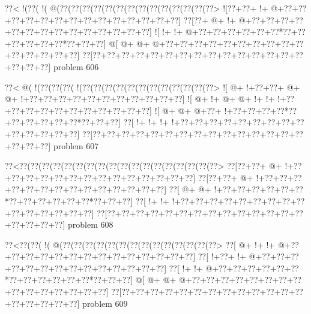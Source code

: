 \vbox{\vbox{\goo
\0??<\- !(\0??(\- !(\- @(\0??(\0??(\0??(\0??(\0??(\0??(\0??(\0??(\0??(\0??(\0??(\0??(\0??(\0??>
\- ![\0??+\0??+\- !+\- @+\0??+\0??+\0??+\0??+\0??+\0??+\0??+\0??+\0??+\0??+\0??+\0??+\0??+\0??]
\0??[\0??+\- @+\- !+\- @+\0??+\0??+\0??+\0??+\0??+\0??+\0??+\0??+\0??+\0??+\0??+\0??+\0??+\0??]
\- ![\- !+\- !+\- @+\0??+\0??+\0??+\0??+\0??+\0??*\0??+\0??+\0??+\0??+\0??+\0??*\0??+\0??+\0??]
\- @[\- @+\- @+\- @+\0??+\0??+\0??+\0??+\0??+\0??+\0??+\0??+\0??+\0??+\0??+\0??+\0??+\0??+\0??]
\0??[\0??+\0??+\0??+\0??+\0??+\0??+\0??+\0??+\0??+\0??+\0??+\0??+\0??+\0??+\0??+\0??+\0??+\0??]
}
\hfil problem 606\hfil\break
}



\vbox{\vbox{\goo
\0??<\- @(\- !(\0??(\0??(\0??(\- !(\0??(\0??(\0??(\0??(\0??(\0??(\0??(\0??(\0??(\0??(\0??(\0??>
\- ![\- @+\- !+\0??+\0??+\- @+\- @+\- !+\0??+\0??+\0??+\0??+\0??+\0??+\0??+\0??+\0??+\0??+\0??]
\- ![\- @+\- !+\- @+\- @+\- !+\- !+\- !+\0??+\0??+\0??+\0??+\0??+\0??+\0??+\0??+\0??+\0??+\0??]
\- ![\- @+\- @+\- @+\0??+\- !+\0??+\0??+\0??+\0??*\0??+\0??+\0??+\0??+\0??+\0??*\0??+\0??+\0??]
\0??[\- !+\- !+\- !+\- !+\0??+\0??+\0??+\0??+\0??+\0??+\0??+\0??+\0??+\0??+\0??+\0??+\0??+\0??]
\0??[\0??+\0??+\0??+\0??+\0??+\0??+\0??+\0??+\0??+\0??+\0??+\0??+\0??+\0??+\0??+\0??+\0??+\0??]
}
\hfil problem 607\hfil\break
}



\vbox{\vbox{\goo
\0??<\0??(\0??(\0??(\0??(\0??(\0??(\0??(\0??(\0??(\0??(\0??(\0??(\0??(\0??(\0??(\0??(\0??(\0??>
\0??[\0??+\0??+\- @+\- !+\0??+\0??+\0??+\0??+\0??+\0??+\0??+\0??+\0??+\0??+\0??+\0??+\0??+\0??]
\0??[\0??+\0??+\- @+\- !+\0??+\0??+\0??+\0??+\0??+\0??+\0??+\0??+\0??+\0??+\0??+\0??+\0??+\0??]
\0??[\- @+\- @+\- !+\0??+\0??+\0??+\0??+\0??+\0??*\0??+\0??+\0??+\0??+\0??+\0??*\0??+\0??+\0??]
\0??[\- !+\- !+\- !+\0??+\0??+\0??+\0??+\0??+\0??+\0??+\0??+\0??+\0??+\0??+\0??+\0??+\0??+\0??]
\0??[\0??+\0??+\0??+\0??+\0??+\0??+\0??+\0??+\0??+\0??+\0??+\0??+\0??+\0??+\0??+\0??+\0??+\0??]
}
\hfil problem 608\hfil\break
}



\vbox{\vbox{\goo
\0??<\0??(\0??(\- !(\- @(\0??(\0??(\0??(\0??(\0??(\0??(\0??(\0??(\0??(\0??(\0??(\0??(\0??(\0??>
\0??[\- @+\- !+\- !+\- @+\0??+\0??+\0??+\0??+\0??+\0??+\0??+\0??+\0??+\0??+\0??+\0??+\0??+\0??]
\0??[\- !+\0??+\- !+\- @+\0??+\0??+\0??+\0??+\0??+\0??+\0??+\0??+\0??+\0??+\0??+\0??+\0??+\0??]
\0??[\- !+\- !+\- @+\0??+\0??+\0??+\0??+\0??+\0??*\0??+\0??+\0??+\0??+\0??+\0??*\0??+\0??+\0??]
\- @[\- @+\- @+\- @+\0??+\0??+\0??+\0??+\0??+\0??+\0??+\0??+\0??+\0??+\0??+\0??+\0??+\0??+\0??]
\0??[\0??+\0??+\0??+\0??+\0??+\0??+\0??+\0??+\0??+\0??+\0??+\0??+\0??+\0??+\0??+\0??+\0??+\0??]
}
\hfil problem 609\hfil\break
}



